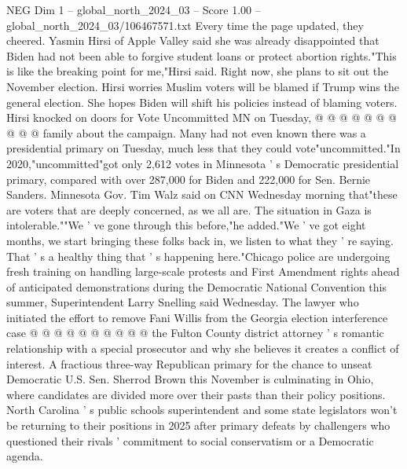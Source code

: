 \begin{textsample}{NEG Dim 1 – global\_north\_2024\_03 – Score 1.00 – global\_north\_2024\_03/106467571.txt}
Every time the page updated, they cheered.
Yasmin Hirsi of Apple Valley said she was already disappointed that Biden had not been able to forgive student loans or protect abortion rights."This is like the breaking point for me,"Hirsi said.
Right now, she plans to sit out the November election.
Hirsi worries Muslim voters will be blamed if Trump wins the general election.
She hopes Biden will shift his policies instead of blaming voters.
Hirsi knocked on doors for Vote Uncommitted MN on Tuesday, @ @ @ @ @ @ @ @ @ @ family about the campaign.
Many had not even known there was a presidential primary on Tuesday, much less that they could vote"uncommitted."In 2020,"uncommitted"got only 2,612 votes in Minnesota ' s Democratic presidential primary, compared with over 287,000 for Biden and 222,000 for Sen.
Bernie Sanders.
Minnesota Gov.
Tim Walz said on CNN Wednesday morning that"these are voters that are deeply concerned, as we all are.
The situation in Gaza is intolerable.""We ' ve gone through this before,"he added."We ' ve got eight months, we start bringing these folks back in, we listen to what they ' re saying.
That ' s a healthy thing that ' s happening here."Chicago police are undergoing fresh training on handling large-scale protests and First Amendment rights ahead of anticipated demonstrations during the Democratic National Convention this summer, Superintendent Larry Snelling said Wednesday.
The lawyer who initiated the effort to remove Fani Willis from the Georgia election interference case @ @ @ @ @ @ @ @ @ @ the Fulton County district attorney ' s romantic relationship with a special prosecutor and why she believes it creates a conflict of interest.
A fractious three-way Republican primary for the chance to unseat Democratic U.S.
Sen.
Sherrod Brown this November is culminating in Ohio, where candidates are divided more over their pasts than their policy positions.
North Carolina ' s public schools superintendent and some state legislators won't be returning to their positions in 2025 after primary defeats by challengers who questioned their rivals ' commitment to social conservatism or a Democratic agenda.

\end{textsample}
